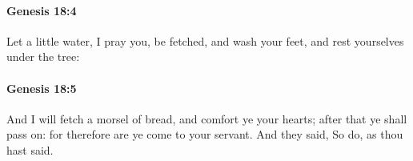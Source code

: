 		\paragraph{Genesis 18:4} %
			\label{GENESIS-18-4}

			Let a little water, I pray you, be fetched, and wash your feet, and rest yourselves under the tree:


		\paragraph{Genesis 18:5} %
			\label{GENESIS-18-5}

			And I will fetch a morsel of bread, and comfort ye your hearts; after that ye shall pass on: for therefore are ye come to your servant. And they said, So do, as thou hast said.


